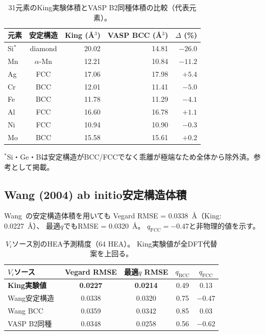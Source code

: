 \documentclass[5p,10pt]{elsarticle}
\begin{document}
\begin{table}[H]
\centering
\caption{31元素のKing実験体積とVASP B2同種体積の比較（代表元素）。}
\label{tab:king_vs_vasp_bcc}
\footnotesize
\begin{tabular}{@{}lcrrr@{}}
\toprule
元素 & 安定構造 & King (\AA$^3$) & VASP BCC (\AA$^3$) & $\Delta$ (\%) \\
\midrule
Si$^*$  & diamond    & 20.02 & 14.81 & $\mathbf{-26.0}$ \\
Mn      & $\alpha$-Mn & 12.21 & 10.84 & $\mathbf{-11.2}$ \\
Ag      & FCC        & 17.06 & 17.98 & $\mathbf{+5.4}$ \\
Cr      & BCC        & 12.01 & 11.41 & $\mathbf{-5.0}$ \\
Fe      & BCC        & 11.78 & 11.29 & $\mathbf{-4.1}$ \\
Al      & FCC        & 16.60 & 16.78 & $+1.1$ \\
Ni      & FCC        & 10.94 & 10.90 & $-0.3$ \\
Mo      & BCC        & 15.58 & 15.61 & $+0.2$ \\
\bottomrule
\end{tabular}
\par\smallskip
{\scriptsize $^*$Si・Ge・Bは安定構造がBCC/FCCでなく乖離が極端なため全体から除外済。参考として掲載。}
\end{table}

\subsection{Wang (2004) ab initio安定構造体積}
\label{sec:appendix_wang}

Wang~\cite{Wang2004lattice}の安定構造体積を用いても
Vegard RMSE = 0.0338~\AA{}（King: 0.0227~\AA{}）、
最適$q$でもRMSE = 0.0320~\AA{}。
$q_\text{FCC} = -0.47$と非物理的値を示す。

\begin{table}[H]
\centering
\caption{$V_i$ソース別のHEA予測精度（64 HEA）。
  King実験値が全DFT代替案を上回る。}
\label{tab:vi_comparison}
\footnotesize
\begin{tabular}{@{}lcccc@{}}
\toprule
$V_i$ソース & Vegard RMSE & 最適$q$ RMSE & $q_\text{BCC}$ & $q_\text{FCC}$ \\
\midrule
\textbf{King実験値}  & \textbf{0.0227} & \textbf{0.0214} & 0.49 & 0.13 \\
Wang安定構造~\cite{Wang2004lattice}   & 0.0338 & 0.0320 & 0.75 & $-0.47$ \\
Wang BCC     & 0.0359 & 0.0342 & 0.85 & 0.03 \\
VASP B2同種  & 0.0348 & 0.0258 & 0.56 & $-0.62$ \\
\bottomrule
\end{tabular}
\end{table}
\end{document}
